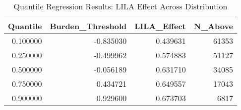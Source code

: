 \begin{table}
\caption{Quantile Regression Results: LILA Effect Across Distribution}
\begin{tabular}{rrrr}
\toprule
Quantile & Burden_Threshold & LILA_Effect & N_Above \\
\midrule
0.100000 & -0.835030 & 0.439631 & 61353 \\
0.250000 & -0.499962 & 0.574883 & 51127 \\
0.500000 & -0.056189 & 0.631710 & 34085 \\
0.750000 & 0.434721 & 0.649557 & 17043 \\
0.900000 & 0.929600 & 0.673703 & 6817 \\
\bottomrule
\end{tabular}
\end{table}
